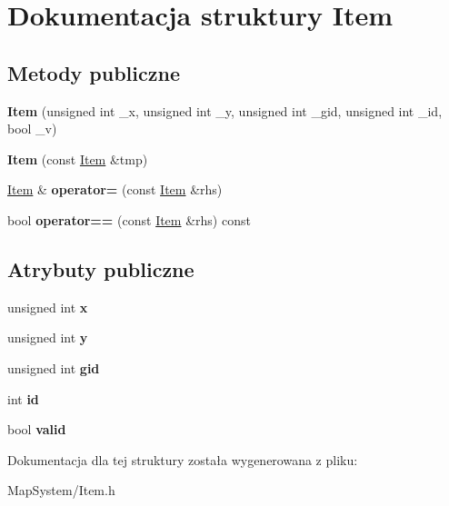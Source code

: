 \hypertarget{struct_item}{\section{Dokumentacja struktury Item}
\label{struct_item}
}
\subsection*{Metody publiczne}
\begin{DoxyCompactItemize}
\item 
\hypertarget{struct_item_a19f39018c0a5828820d71010379c3ed2}{{\bfseries Item} (unsigned int \-\_\-x, unsigned int \-\_\-y, unsigned int \-\_\-gid, unsigned int \-\_\-id, bool \-\_\-v)}\label{struct_item_a19f39018c0a5828820d71010379c3ed2}

\item 
\hypertarget{struct_item_aec504a524d83a24df80e6585c7db7792}{{\bfseries Item} (const \hyperlink{struct_item}{Item} \&tmp)}\label{struct_item_aec504a524d83a24df80e6585c7db7792}

\item 
\hypertarget{struct_item_a8e4ebdab0cc6e9e9cd1156f328d81ca8}{\hyperlink{struct_item}{Item} \& {\bfseries operator=} (const \hyperlink{struct_item}{Item} \&rhs)}\label{struct_item_a8e4ebdab0cc6e9e9cd1156f328d81ca8}

\item 
\hypertarget{struct_item_af46dc96b212e1fe2710e04a6c7b262ff}{bool {\bfseries operator==} (const \hyperlink{struct_item}{Item} \&rhs) const }\label{struct_item_af46dc96b212e1fe2710e04a6c7b262ff}

\end{DoxyCompactItemize}
\subsection*{Atrybuty publiczne}
\begin{DoxyCompactItemize}
\item 
\hypertarget{struct_item_a9d5f77ac922932e7743b4dc0d1fbf67f}{unsigned int {\bfseries x}}\label{struct_item_a9d5f77ac922932e7743b4dc0d1fbf67f}

\item 
\hypertarget{struct_item_a758822c85d6baeadd828cbc0b4ef14b8}{unsigned int {\bfseries y}}\label{struct_item_a758822c85d6baeadd828cbc0b4ef14b8}

\item 
\hypertarget{struct_item_a0b31e0d6e016bc211e6a07ccedaf721f}{unsigned int {\bfseries gid}}\label{struct_item_a0b31e0d6e016bc211e6a07ccedaf721f}

\item 
\hypertarget{struct_item_ae901ac3ab2273113f746340a7db4e388}{int {\bfseries id}}\label{struct_item_ae901ac3ab2273113f746340a7db4e388}

\item 
\hypertarget{struct_item_ad391b381597b6df426c21cc5f3a994a8}{bool {\bfseries valid}}\label{struct_item_ad391b381597b6df426c21cc5f3a994a8}

\end{DoxyCompactItemize}


Dokumentacja dla tej struktury została wygenerowana z pliku\-:\begin{DoxyCompactItemize}
\item 
Map\-System/Item.\-h\end{DoxyCompactItemize}
